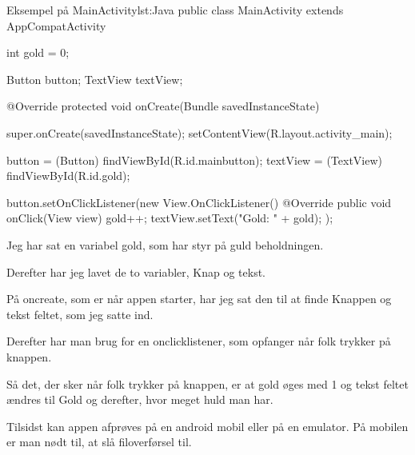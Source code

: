 \begin{JavaCode}{Eksempel på MainActivity}{lst:Java}
	public class MainActivity extends AppCompatActivity {
		int gold = 0;
		
		Button button;
		TextView textView;
		
		@Override
		protected void onCreate(Bundle savedInstanceState) {
			super.onCreate(savedInstanceState);
			setContentView(R.layout.activity_main);
			
			button = (Button) findViewById(R.id.mainbutton);
			textView = (TextView) findViewById(R.id.gold);
			
			button.setOnClickListener(new View.OnClickListener() {
				@Override
				public void onClick(View view) {
					gold++;
					textView.setText("Gold: " + gold);	
				}
			});
		}
	}
\end{JavaCode}

Jeg har sat en variabel gold, som har styr på guld beholdningen. 

Derefter har jeg lavet de to variabler, Knap og tekst. 

På oncreate, som er når appen starter, har jeg sat den til at finde Knappen og tekst feltet, som jeg satte ind. 

Derefter har man brug for en onclicklistener, som opfanger når folk trykker på knappen. 

Så det, der sker når folk trykker på knappen, er at gold øges med 1 og tekst feltet ændres til Gold og derefter, hvor meget huld man har. 

Tilsidst kan appen afprøves på en android mobil eller på en emulator. På mobilen er man nødt til,   at slå filoverførsel til. 






